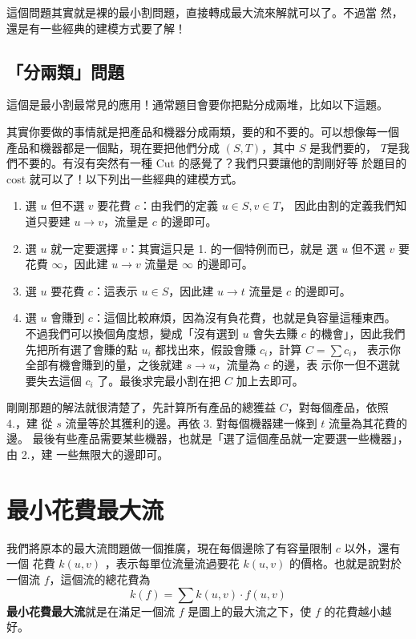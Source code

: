 \documentclass[a4paper,12pt]{book}
\begin{document}
這個問題其實就是裸的最小割問題，直接轉成最大流來解就可以了。不過當
然，還是有一些經典的建模方式要了解！

\subsection{「分兩類」問題}
這個是最小割最常見的應用！通常題目會要你把點分成兩堆，比如以下這題。


其實你要做的事情就是把產品和機器分成兩類，要的和不要的。可以想像每一個
產品和機器都是一個點，現在要把他們分成 $(S, T)$，其中 $S$ 是我們要的，
$T$是我們不要的。有沒有突然有一種 Cut 的感覺了？我們只要讓他的割剛好等
於題目的 cost 就可以了！以下列出一些經典的建模方式。
\begin{enumerate}
  \item 選 $u$ 但不選 $v$ 要花費 $c$：由我們的定義 $u \in S, v \in T$，
    因此由割的定義我們知道只要建 $u \rightarrow v$，流量是 $c$ 的邊即可。
  \item 選 $u$ 就一定要選擇 $v$：其實這只是 1. 的一個特例而已，就是
    選 $u$ 但不選 $v$ 要花費 $\infty$，因此建 $u \rightarrow v$ 流量是 $\infty$ 
    的邊即可。
  \item 選 $u$ 要花費 $c$：這表示 $u \in S$，因此建 $u \rightarrow t$ 流量是
    $c$ 的邊即可。
  \item 選 $u$ 會賺到 $c$：這個比較麻煩，因為沒有負花費，也就是負容量這種東西。
    不過我們可以換個角度想，變成「沒有選到 $u$ 會失去賺 $c$ 的機會」，因此我們
    先把所有選了會賺的點 $u_i$ 都找出來，假設會賺 $c_i$，計算 $C = \sum c_i$，
    表示你全部有機會賺到的量，之後就建 $s \rightarrow u$，流量為 $c$ 的邊，表
    示你一但不選就要失去這個 $c_i$ 了。最後求完最小割在把 $C$ 加上去即可。
\end{enumerate}
剛剛那題的解法就很清楚了，先計算所有產品的總獲益 $C$，對每個產品，依照 4.，建
從 $s$ 流量等於其獲利的邊。再依 3. 對每個機器建一條到 $t$ 流量為其花費的邊。
最後有些產品需要某些機器，也就是「選了這個產品就一定要選一些機器」，由 2.，建
一些無限大的邊即可。

\section{最小花費最大流}
我們將原本的最大流問題做一個推廣，現在每個邊除了有容量限制 $c$ 以外，還有一個
花費 $k(u, v)$ ，表示每單位流量流過要花 $k(u, v)$ 的價格。也就是說對於一個流
$f$，這個流的總花費為
\[ k(f) = \sum k(u, v) \cdot f(u, v) \]
{\bf 最小花費最大流}就是在滿足一個流 $f$ 是圖上的最大流之下，使 $f$ 的花費越小越好。
\end{document}
